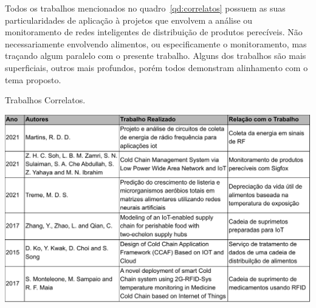 

Todos os trabalhos mencionados no quadro~\ref{qd:correlatos} possuem as suas particularidades de aplicação à projetos que envolvem a análise ou monitoramento de redes inteligentes de distribuição de produtos perecíveis. Não necessariamente envolvendo alimentos, ou especificamente o monitoramento, mas traçando algum paralelo com o presente trabalho.
Alguns dos trabalhos são mais superficiais, outros mais profundos, porém todos demonstram alinhamento com o tema proposto.

\begin{quadro}
  \caption{Trabalhos Correlatos.}
  \begin{center}
      \includegraphics[scale=0.64]{img/correlatos.pdf}
  \end{center}
  \label{qd:correlatos}
\end{quadro}




